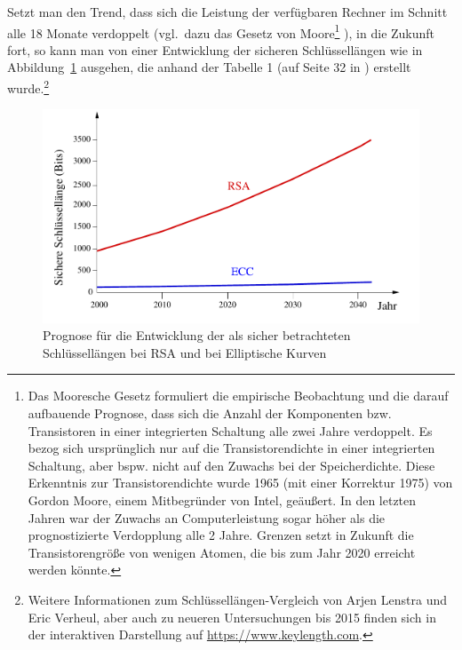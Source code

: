 \begin{refsegment}
Setzt man den Trend, dass sich die Leistung der verfügbaren Rechner im
Schnitt alle 18 Monate verdoppelt (vgl.\ dazu das Gesetz von
Moore\footnote{%
  Das Mooresche Gesetz formuliert die empirische Beobachtung und die darauf
  aufbauende Prognose, dass sich die Anzahl der Komponenten bzw. Transistoren
  in einer integrierten Schaltung alle zwei Jahre verdoppelt. Es bezog sich
  ursprünglich nur auf die Transistorendichte in einer integrierten Schaltung,
  aber bspw. nicht auf den Zuwachs bei der Speicherdichte.
  Diese Erkenntnis zur Transistorendichte wurde 1965 (mit einer Korrektur 1975)
  von Gordon Moore, einem Mitbegründer von Intel, geäußert.
  In den letzten Jahren war der Zuwachs an Computerleistung sogar höher als
  die prognostizierte Verdopplung alle 2 Jahre. Grenzen setzt in Zukunft die
  Transistorengröße von wenigen Atomen, die bis zum Jahr 2020 erreicht werden könnte.
}%
), in die Zukunft fort, so kann man von einer Entwicklung der
sicheren Schlüssellängen wie in Abbildung~\ref{RSAKeylength} ausgehen,
die anhand der Tabelle 1 (auf Seite 32 in \cite{LeVe2001}) erstellt
wurde.\footnote{%
  Weitere Informationen zum Schlüssellängen-Vergleich von Arjen Lenstra und
  Eric Verheul, aber auch zu neueren Untersuchungen bis 2015 finden sich
  in der interaktiven Darstellung auf \url{https://www.keylength.com}.
}

\begin{figure}[ht]
\begin{center}
\includegraphics[scale=0.7]{figures/RSAKeyLength-2}
\caption{Prognose für die Entwicklung der als sicher betrachteten
  Schlüssellängen bei RSA und bei Elliptische Kurven}
\label{RSAKeylength}
\end{center}
\end{figure}



\end{refsegment}
